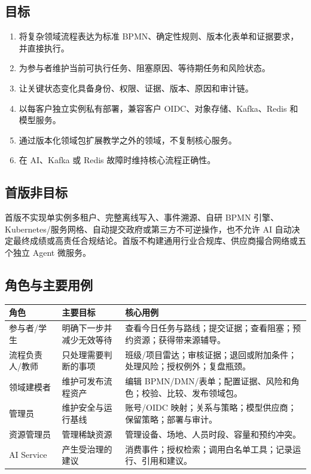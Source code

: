 \documentclass[journal,a4paper,onecolumn]{IEEEtran}
\begin{document}
\subsection{目标}
\begin{enumerate}[leftmargin=*]
\item 将复杂领域流程表达为标准 BPMN、确定性规则、版本化表单和证据要求，并直接执行。
\item 为参与者维护当前可执行任务、阻塞原因、等待期任务和风险状态。
\item 让关键状态变化具备身份、权限、证据、版本、原因和审计链。
\item 以每客户独立实例私有部署，兼容客户 OIDC、对象存储、Kafka、Redis 和模型服务。
\item 通过版本化领域包扩展教学之外的领域，不复制核心服务。
\item 在 AI、Kafka 或 Redis 故障时维持核心流程正确性。
\end{enumerate}

\subsection{首版非目标}
首版不实现单实例多租户、完整离线写入、事件溯源、自研 BPMN 引擎、Kubernetes/服务网格、自动提交政府或第三方不可逆操作，也不允许 AI 自动决定最终成绩或高责任合规结论。首版不构建通用行业合规库、供应商撮合网络或五个独立 Agent 微服务。

\subsection{角色与主要用例}
\begin{longtable}{p{}p{}p{}}
\toprule
角色 & 主要目标 & 核心用例 \\
\midrule
\endhead
参与者/学生 & 明确下一步并减少无效等待 & 查看今日任务与路线；提交证据；查看阻塞；预约资源；获得带来源辅导。\\
流程负责人/教师 & 只处理需要判断的事项 & 班级/项目雷达；审核证据；退回或附加条件；处理风险；授权例外；复盘瓶颈。\\
领域建模者 & 维护可发布流程资产 & 编辑 BPMN/DMN/表单；配置证据、风险和角色；校验、比较、发布领域包。\\
管理员 & 维护安全与运行基线 & 账号/OIDC 映射；关系与策略；模型供应商；保留策略；部署与审计。\\
资源管理员 & 管理稀缺资源 & 管理设备、场地、人员时段、容量和预约冲突。\\
AI Service & 产生受治理的建议 & 消费事件；授权检索；调用白名单工具；记录运行、引用和建议。\\
\bottomrule
\end{longtable}
\end{document}
